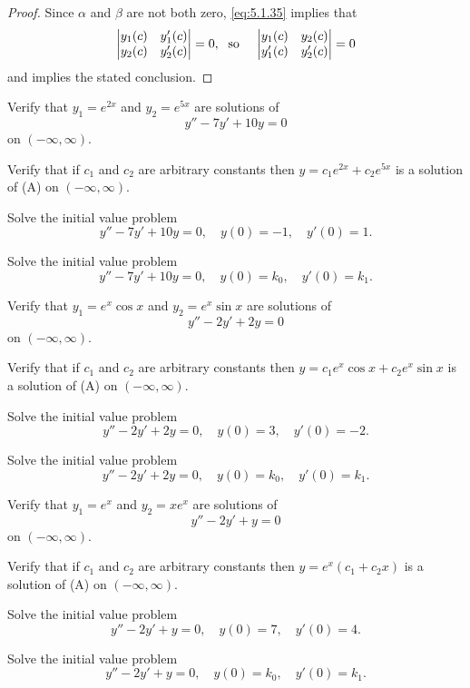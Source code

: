 \begin{proof}
Since $\alpha$ and $\beta$ are not both zero,   \eqref{eq:5.1.35}
implies that
\[
\begin{vmatrix}
y_{1}(c)&y_{1}'(c)\\y_{2}(c)& y_{2}'(c)
\end{vmatrix}=0, \text{\;    so\;  \;  }
\begin{vmatrix}
y_{1}(c)&y_{2}(c)\\ y_{1}'(c)&y_{2}'(c)
\end{vmatrix}=0
\]
and  implies the stated conclusion.
\end{proof}

\exercises

\begin{exerciselist}

\item\label{exer:5.1.1}\begin{alist}
\item %
Verify that $y_1=e^{2x}$ and $y_2=e^{5x}$ are solutions of
\[
y''-7y'+10y=0\tag{A}
\]
on  $(-\infty,\infty)$.
\item %
Verify that if $c_1$ and $c_2$ are arbitrary constants then
$y=c_1e^{2x}+c_2e^{5x}$ is a solution of (A) on
$(-\infty,\infty)$.
\item %
Solve the initial value problem
\[
y''-7y'+10y=0,\quad  y(0)=-1,\quad y'(0)=1.
\]
\item %
Solve the initial value problem
\[
y''-7y'+10y=0,\quad  y(0)=k_0,\quad y'(0)=k_1.
\]
\end{alist}

\item\label{exer:5.1.2}\begin{alist}
\item %
Verify that $y_1=e^x\cos x$ and $y_2=e^x\sin x$ are solutions of
\[
y''-2y'+2y=0\tag{A}
\]
on  $(-\infty,\infty)$.
\item %
Verify that if $c_1$ and $c_2$ are arbitrary constants   then
$y=c_1e^x\cos x+c_2e^x\sin x$ is a solution of (A)
on
$(-\infty,\infty)$.
\item %
Solve the initial value problem
\[
y''-2y'+2y=0,\quad  y(0)=3,\quad y'(0)=-2.
\]
\item %
Solve the initial value problem
\[
y''-2y'+2y=0,\quad  y(0)=k_0,\quad y'(0)=k_1.
\]
\end{alist}

\item\label{exer:5.1.3}\begin{alist}
\item %
Verify that $y_1=e^x$ and $y_2=xe^x$ are solutions of
\[
y''-2y'+y=0\tag{A}
\]
on  $(-\infty,\infty)$.
\item %
Verify that if $c_1$ and $c_2$ are arbitrary constants then
$y=e^x(c_1+c_2x)$ is a solution of (A) on
$(-\infty,\infty)$.
\item %
Solve the initial value problem
\[
y''-2y'+y=0,\quad  y(0)=7,\quad y'(0)=4.
\]
\item %
Solve the initial value problem
\[
y''-2y'+y=0,\quad  y(0)=k_0,\quad y'(0)=k_1.
\]
\end{alist}



\end{exerciselist}
